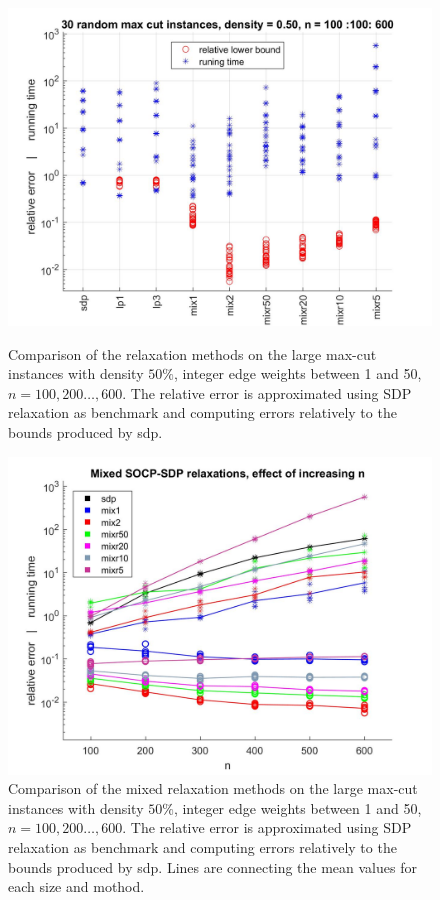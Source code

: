 \documentclass[12pt]{book}
\theoremstyle{definition}
\begin{document}
 


\begin{center}
\begin{figure}
\includegraphics[scale=0.27]{img/comp3.jpg}
\caption[Comparison of relaxations - large, dense instances of max-cut 1]{Comparison of the relaxation methods on the large max-cut instances with density  $50\%$, integer edge weights between 1 and 50, $n=100,200\dots ,600$. The relative error is approximated using SDP relaxation as benchmark and computing errors relatively to the bounds produced by sdp.} 
\label{comp3}

\includegraphics[scale=0.27]{img/comp_mix_n_100-600.jpg}
\caption[Comparison of relaxations - large, dense instances of max-cut 2]{Comparison of the mixed relaxation methods on the large max-cut instances with density  $50\%$, integer edge weights between 1 and 50, $n=100,200\dots ,600$. The relative error is approximated using SDP relaxation as benchmark and computing errors relatively to the bounds produced by sdp. Lines are connecting the mean values for each size and mothod.} 
\label{comp3size}
\end{figure}
\end{center}
\end{document}
